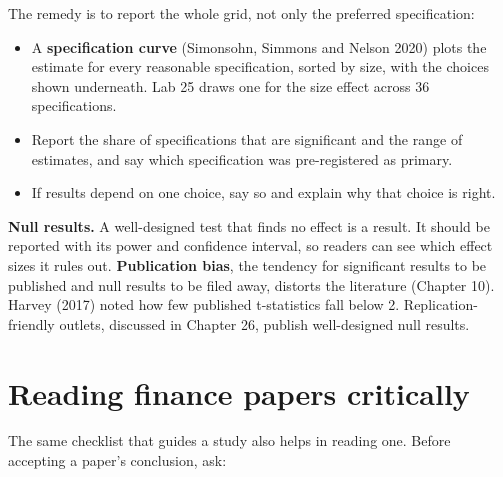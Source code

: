 The remedy is to report the whole grid, not only the preferred specification:

\begin{itemize}
  \item A \textbf{specification curve} (Simonsohn, Simmons and Nelson 2020) plots the estimate for every reasonable specification, sorted by size, with the choices shown underneath. Lab 25 draws one for the size effect across 36 specifications.
  \item Report the share of specifications that are significant and the range of estimates, and say which specification was pre-registered as primary.
  \item If results depend on one choice, say so and explain why that choice is right.
\end{itemize}

\textbf{Null results.} A well-designed test that finds no effect is a result. It should be reported with its power and confidence interval, so readers can see which effect sizes it rules out. \textbf{Publication bias}, the tendency for significant results to be published and null results to be filed away, distorts the literature (Chapter 10). Harvey (2017) noted how few published t-statistics fall below 2. Replication-friendly outlets, discussed in Chapter 26, publish well-designed null results.

\section{Reading finance papers critically}
\label{sec:25-reading}

The same checklist that guides a study also helps in reading one. Before accepting a paper's conclusion, ask:

